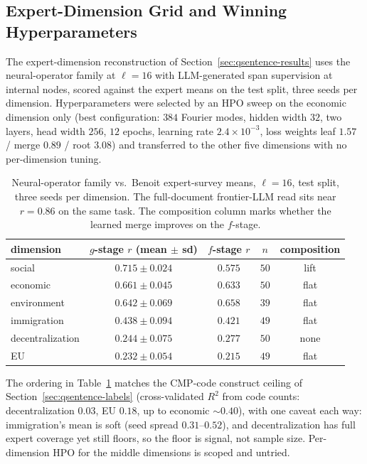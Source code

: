 \subsection{Expert-Dimension Grid and Winning Hyperparameters}

The expert-dimension reconstruction of
Section~\ref{sec:qsentence-results} uses the neural-operator family at
$\ell = 16$ with LLM-generated span supervision at internal nodes,
scored against the \citet{BenoitEtAl2025} expert means on the test
split, three seeds per dimension. Hyperparameters were selected by an
HPO sweep on the economic dimension only
(best configuration: $384$ Fourier modes, hidden width $32$, two
layers, head width $256$, $12$ epochs, learning rate
$2.4\times10^{-3}$, loss weights leaf $1.57$ / merge $0.89$ / root
$3.08$) and transferred to the other five dimensions with no
per-dimension tuning.

\begin{table}[htbp]
    \centering
    \begin{tabular}{lcccc}
    \toprule
    dimension & $g$-stage $r$ (mean $\pm$ sd) & $f$-stage $r$ & $n$ & composition \\
    \midrule
    social           & $\mathbf{0.715 \pm 0.024}$ & $0.575$ & $50$ & lift \\
    economic         & $0.661 \pm 0.045$ & $0.633$ & $50$ & flat \\
    environment      & $0.642 \pm 0.069$ & $0.658$ & $39$ & flat \\
    immigration      & $0.438 \pm 0.094$ & $0.421$ & $49$ & flat \\
    decentralization & $0.244 \pm 0.075$ & $0.277$ & $50$ & none \\
    EU               & $0.232 \pm 0.054$ & $0.215$ & $49$ & flat \\
    \bottomrule
    \end{tabular}
    \caption{Neural-operator family vs.\ Benoit expert-survey means,
    $\ell = 16$, test split, three seeds per dimension. The
    full-document frontier-LLM read sits near $r = 0.86$ on the same
    task. The composition column marks whether the learned merge
    improves on the $f$-stage.}
    \label{tab:app-benoit-6dim-fno}
\end{table}

The ordering in Table~\ref{tab:app-benoit-6dim-fno} matches the
CMP-code construct ceiling of Section~\ref{sec:qsentence-labels}
(cross-validated $R^2$ from code counts: decentralization $0.03$, EU
$0.18$, up to economic $\sim 0.40$), with one caveat each way:
immigration's mean is soft (seed spread $0.31$--$0.52$), and
decentralization has full expert coverage yet still floors, so the
floor is signal, not sample size. Per-dimension HPO for the middle
dimensions is scoped and untried. 
